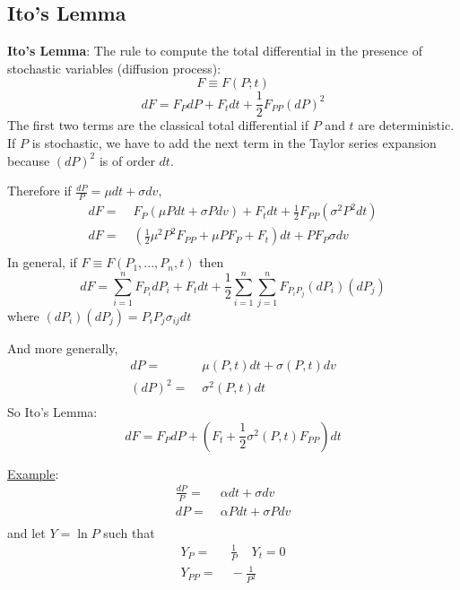 \documentclass[
14pt,notheorems,hyperref={pdfauthor=whatever}
]{beamer}
\begin{document}
\subsection{Ito's Lemma}
\begin{frame}
\textbf{Ito's Lemma}: The rule to compute the total differential in the presence of stochastic variables (diffusion process):
\[F \equiv F(P;t)\]
\[dF = F_P dP + F_t dt + \frac{1}{2} F_{PP}(dP)^2\]
The first two terms are the classical total differential if $P$ and $t$ are deterministic.\\
\hfill\break
If $P$ is stochastic, we have to add the next term in the Taylor series expansion because $(dP)^2$ is of order $dt$.
\end{frame}

\begin{frame}
Therefore if $\frac{dP}{P} = \mu dt + \sigma dv$,\\
\begin{align*}
    dF =&\; F_P(\mu P dt + \sigma P dv)+F_t dt + \frac{1}{2} F_{PP}(\sigma^2 P^2 dt)\\
    dF =&\; (\frac{1}{2} \mu^2P^2 F_{PP}+\mu P F_P+F_t)dt+P F_P \sigma dv\\
\end{align*}
In general, if $F \equiv F(P_1,...,P_n,t)$ then\\
\[dF = \sum_{i=1}^n F_{P_i}dP_i + F_tdt + \frac{1}{2} \sum_{i=1}^n\sum_{j=1}^n F_{P_iP_j}(dP_i)(dP_j)\]
where $(dP_i)(dP_j) = P_i P_j \sigma_{ij} dt$\\
\end{frame}

\begin{frame}
And more generally,
\begin{align*}
    dP =&\; \mu(P,t) dt + \sigma(P,t) dv\\
    (dP)^2 =&\; \sigma^2(P,t) dt\\
\end{align*}
So  Ito's Lemma:
\[dF = F_P dP + (F_t + \frac{1}{2} \sigma^2(P,t)F_{PP})dt\]
\end{frame}

\begin{frame}
\underline{Example}:
\begin{align*}
    \frac{dP}{P} =&\; \alpha dt + \sigma dv\\
    dP =&\; \alpha P dt + \sigma P dv\\
\end{align*}
and let $Y = \ln{P}$ such that
\begin{align*}
    Y_P =&\; \frac{1}{P} \;\;\;\; Y_t=0\\
    Y_{PP} =&\; -\frac{1}{P^2}\\
\end{align*}
\end{frame}
\end{document}
